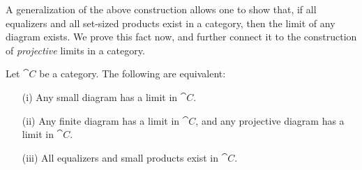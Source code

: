 A generalization of the above construction allows one to show that, if all equalizers and all set-sized products exist in a category, then the limit of any diagram exists. We prove this fact now, and further connect it to the construction of \emph{projective} limits in a category.
\begin{proposition}
  \label{prop:complete-category}
Let $\cat{C}$ be a category. The following are equivalent:
\begin{enumerate}
  \item[(i)] Any small diagram has a limit in $\cat{C}$. 
  \item[(ii)] Any finite diagram has a limit in $\cat{C}$, and any projective diagram has a limit in $\cat{C}$.
  \item[(iii)] All equalizers and small products exist in $\cat{C}$.
\end{enumerate}
\end{proposition}
